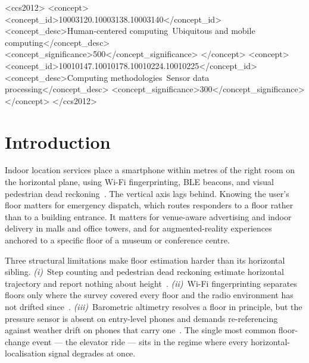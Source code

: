 \documentclass[manuscript,review,screen]{acmart}
\begin{document}
\begin{CCSXML}
<ccs2012>
 <concept>
  <concept_id>10003120.10003138.10003140</concept_id>
  <concept_desc>Human-centered computing~Ubiquitous and mobile computing</concept_desc>
  <concept_significance>500</concept_significance>
 </concept>
 <concept>
  <concept_id>10010147.10010178.10010224.10010225</concept_id>
  <concept_desc>Computing methodologies~Sensor data processing</concept_desc>
  <concept_significance>300</concept_significance>
 </concept>
</ccs2012>
\end{CCSXML}



\maketitle

\section{Introduction}
\label{sec:intro}

Indoor location services place a smartphone within metres of the right
room on the horizontal plane, using Wi-Fi fingerprinting, BLE beacons,
and visual pedestrian dead reckoning~\cite{liu2007indoor}.  The
vertical axis lags behind.  Knowing the user's floor matters for
emergency dispatch, which routes responders to a floor rather than to
a building entrance.  It matters for venue-aware advertising and
indoor delivery in malls and office towers, and for augmented-reality
experiences anchored to a specific floor of a museum or conference
centre.

Three structural limitations make floor estimation harder than its
horizontal sibling.  \emph{(i)}~Step counting and pedestrian dead
reckoning estimate horizontal trajectory and report nothing about
height~\cite{harle2013pdr}.  \emph{(ii)}~Wi-Fi fingerprinting separates
floors only where the survey covered every floor and the radio
environment has not drifted since~\cite{bahl2000radar}.
\emph{(iii)}~Barometric altimetry resolves a floor in principle, but
the pressure sensor is absent on entry-level phones and demands
re-referencing against weather drift on phones that carry
one~\cite{muralidharan2014barometer}.  The single most common floor-change event
--- the elevator ride --- sits in the regime where every
horizontal-localisation signal degrades at once.
\end{document}

